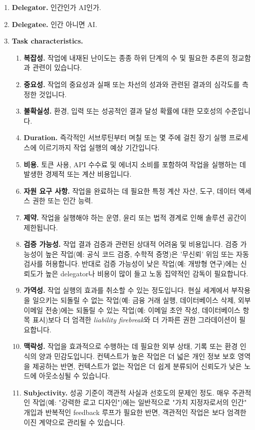 \documentclass[11pt, a4paper, twocolumn, copyright, goog]{google}
\begin{document}
\begin{enumerate}
    \item \textbf{Delegator.} 인간인가 AI인가.
    \item \textbf{Delegatee.} 인간 아니면 AI.
    \item \textbf{Task characteristics.}
        \begin{enumerate}
        \item \textbf{복잡성.} 작업에 내재된 난이도는 종종 하위 단계의 수 및 필요한 추론의 정교함과 관련이 있습니다. 
        \item \textbf{중요성.} 작업의 중요성과 실패 또는 차선의 성과와 관련된 결과의 심각도를 측정한 것입니다. 
        \item \textbf{불확실성.} 환경, 입력 또는 성공적인 결과 달성 확률에 대한 모호성의 수준입니다. 
        \item \textbf{Duration.} 즉각적인 서브루틴부터 며칠 또는 몇 주에 걸친 장기 실행 프로세스에 이르기까지 작업 실행의 예상 기간입니다. 
        \item \textbf{비용.} 토큰 사용, API 수수료 및 에너지 소비를 포함하여 작업을 실행하는 데 발생한 경제적 또는 계산 비용입니다. 
        \item \textbf{자원 요구 사항.} 작업을 완료하는 데 필요한 특정 계산 자산, 도구, 데이터 액세스 권한 또는 인간 능력. 
        \item \textbf{제약.} 작업을 실행해야 하는 운영, 윤리 또는 법적 경계로 인해 솔루션 공간이 제한됩니다.         
        \item \textbf{검증 가능성.} 작업 결과 검증과 관련된 상대적 어려움 및 비용입니다. 검증 가능성이 높은 작업(예: 공식 코드 검증, 수학적 증명)은 '무신뢰' 위임 또는 자동 검사를 허용합니다. 반대로 검증 가능성이 낮은 작업(예: 개방형 연구)에는 신뢰도가 높은 delegator나 비용이 많이 들고 노동 집약적인 감독이 필요합니다.
        \item \textbf{가역성.} 작업 실행의 효과를 취소할 수 있는 정도입니다. 현실 세계에서 부작용을 일으키는 되돌릴 수 없는 작업(예: 금융 거래 실행, 데이터베이스 삭제, 외부 이메일 전송)에는 되돌릴 수 있는 작업(예: 이메일 초안 작성, 데이터베이스 항목 표시)보다 더 엄격한 \emph{liability firebreak}와 더 가파른 권한 그라데이션이 필요합니다.
        \item \textbf{맥락성.} 작업을 효과적으로 수행하는 데 필요한 외부 상태, 기록 또는 환경 인식의 양과 민감도입니다. 컨텍스트가 높은 작업은 더 넓은 개인 정보 보호 영역을 제공하는 반면, 컨텍스트가 없는 작업은 더 쉽게 분류되어 신뢰도가 낮은 노드에 아웃소싱될 수 있습니다.
        \item \textbf{Subjectivity.} 성공 기준이 객관적 사실과 선호도의 문제인 정도. 매우 주관적인 작업(예: "강력한 로고 디자인")에는 일반적으로 "가치 지정자로서의 인간" 개입과 반복적인 feedback 루프가 필요한 반면, 객관적인 작업은 보다 엄격한 이진 계약으로 관리될 수 있습니다.

\end{enumerate}
\end{enumerate}
\end{document}
